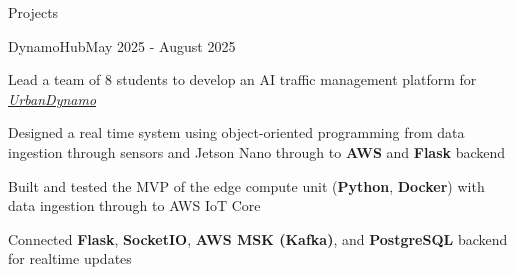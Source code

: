 \documentclass[
	11pt, %
]{resume} %
\begin{document}
\begin{rSection}{Projects}



	\begin{rSubsection}{DynamoHub}{May 2025 - August 2025}{}{}
		\item Lead a team of 8 students to develop an AI traffic management platform for \textit{\href{https://urbandynamo.com}{UrbanDynamo}}
		\item Designed a real time system using object-oriented programming from data ingestion through sensors and Jetson Nano through to \textbf{AWS} and \textbf{Flask} backend
		\item Built and tested the MVP of the edge compute unit (\textbf{Python}, \textbf{Docker}) with data ingestion through to AWS IoT Core
		\item Connected \textbf{Flask}, \textbf{SocketIO}, \textbf{AWS MSK (Kafka)}, and \textbf{PostgreSQL} backend for realtime updates
	\end{rSubsection}
\end{rSection}

%
%
\end{document}
